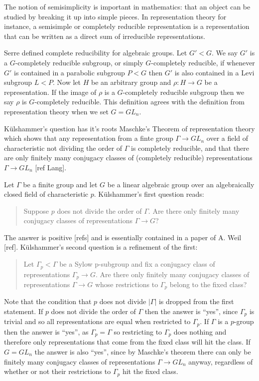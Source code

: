 The notion of semisimplicity is important in mathematics: that an object can be studied by breaking it up into simple pieces. In representation theory for instance, a semisimple or completely reducible representation is a representation that can be written as a direct sum of irreducible representations.


Serre defined complete reducibility for algebraic groups. Let $G' < G$. We say $G'$ is a $G$-completely reducible subgroup, or simply $G$-completely reducible, if whenever $G'$ is contained in a parabolic subgroup $P < G$ then $G'$ is also contained in a Levi subgroup $L < P$. Now let $H$ be an arbitrary group and $\rho:H\rightarrow G$ be a representation. If the image of $\rho$ is a $G$-completely reducible subgroup then we say $\rho$ is $G$-completely reducible. This definition agrees with the definition from representation theory when we set $G=GL_n$.


K\"ulshammer's question has it's roots Maschke's Theorem of representation theory which shows that any representation from a finte group $\Gamma \rightarrow GL_n$ over a field of characteristic not dividing the order of $\Gamma$ is completely reducible, and that there are only finitely many conjugacy classes of (completely reducible) representations $\Gamma \rightarrow GL_n$ [ref Lang].

Let $\Gamma$ be a finite group and let $G$ be a linear algebraic group over an algebraically closed field of characteristic $p$. K\"ulshammer's first question reads:
\begin{quote}
  Suppose $p$ does not divide the order of $\Gamma$. Are there only finitely many conjugacy classes of representations $\Gamma\rightarrow G$?
\end{quote}
The answer is positive [refs] and is essentially contained in a paper of A. Weil [ref]. K\"ulshammer's second question is a refinement of the first:
\begin{quote}
  Let $\Gamma_p < \Gamma$ be a Sylow p-subgroup and fix a conjugacy class of representations $\Gamma_p\rightarrow G$. Are there only finitely many conjugacy classes of representations $\Gamma\rightarrow G$ whose restrictions to $\Gamma_p$ belong to the fixed class?
\end{quote}
Note that the condition that $p$ does not divide $|\Gamma|$ is dropped from the first statement. If $p$ does not divide the order of $\Gamma$ then the answer is ``yes'', since $\Gamma_p$ is trivial and so all representations are equal when restricted to $\Gamma_p$.
If $\Gamma$ is a $p$-group then the answer is ``yes'', as $\Gamma_p = \Gamma$ so restricting to $\Gamma_p$ does nothing and therefore only representations that come from the fixed class will hit the class.
If $G=GL_n$ the answer is also ``yes'', since by Maschke's theorem there can only be finitely many conjugacy classes of representations $\Gamma\rightarrow GL_n$ anyway, regardless of whether or not their restrictions to $\Gamma_p$ hit the fixed class.

